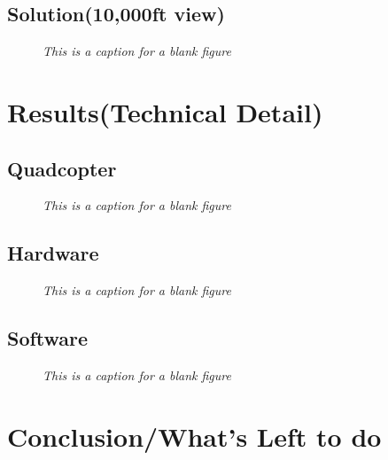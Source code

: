 \documentclass[11pt]{article}
\begin{document}
\subsection{Solution(10,000ft view)}
\blindtext

    \begin{figure}[H]
	\centering	
	\caption{\textit{This is a caption for a blank figure}}	
	\end{figure}


\section{Results(Technical Detail)}
\subsection{Quadcopter}

\blindtext

    \begin{figure}[H]
	\centering	
	\caption{\textit{This is a caption for a blank figure}}	
	\end{figure}

\subsection{Hardware}

\blindtext

    \begin{figure}[H]
	\centering	
	\caption{\textit{This is a caption for a blank figure}}	
	\end{figure}

\subsection{Software}

\blindtext

    \begin{figure}[H]
	\centering	
	\caption{\textit{This is a caption for a blank figure}}	
	\end{figure}



\section{Conclusion/What's Left to do}
\end{document}
